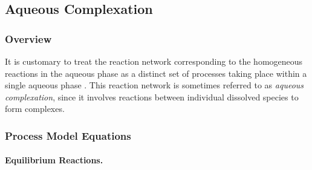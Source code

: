 \subsection{Aqueous Complexation} \label{sec:AqueousComplexation}

\subsubsection{Overview}

It is customary to treat the reaction network corresponding to the homogeneous reactions 
in the aqueous phase as a distinct set of processes taking place within a single aqueous phase \citep{steefel_1996}. 
This reaction network is sometimes referred to as \textit{aqueous complexation}, 
since it involves reactions between individual dissolved species to form complexes.  

\subsubsection{Process Model Equations} \label{sec:aqueous-complexation-eq}

\paragraph{Equilibrium Reactions.} 

